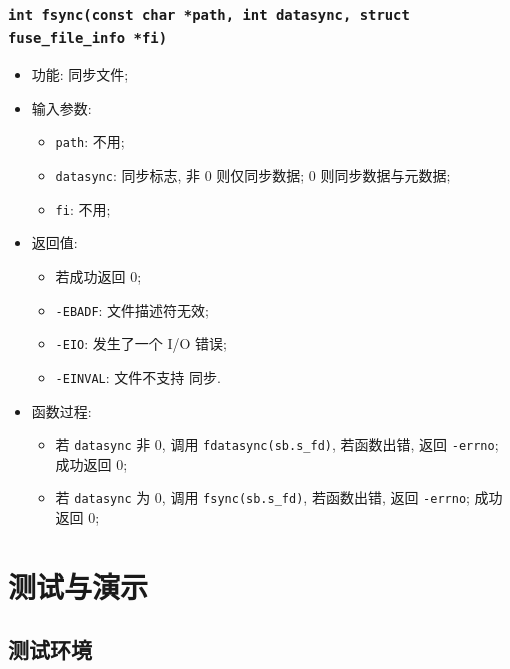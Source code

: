 \documentclass[nofonts]{ctexart}
\begin{document}
  \subsubsection{\texttt{int fsync(const char *path, int datasync, struct fuse\_file\_info *fi)}}

  \begin{itemize}
\item
  功能: 同步文件;
\item
  输入参数:

  \begin{itemize}
  \item
    \texttt{path}: 不用;
  \item
    \texttt{datasync}: 同步标志, 非 0 则仅同步数据; 0
    则同步数据与元数据;
  \item
    \texttt{fi}: 不用;
  \end{itemize}
\item
  返回值:

  \begin{itemize}
  \item
    若成功返回 0;
  \item
    \texttt{-EBADF}: 文件描述符无效;
  \item
    \texttt{-EIO}: 发生了一个 I/O 错误;
  \item
    \texttt{-EINVAL}: 文件不支持 同步.
  \end{itemize}
\item
  函数过程:

  \begin{itemize}
  \item
    若 \texttt{datasync} 非 0, 调用 \texttt{fdatasync(sb.s\_fd)},
    若函数出错, 返回 \texttt{-errno}; 成功返回 0;
  \item
    若 \texttt{datasync} 为 0, 调用 \texttt{fsync(sb.s\_fd)},
    若函数出错, 返回 \texttt{-errno}; 成功返回 0;
  \end{itemize}
\end{itemize}

\section{测试与演示}\label{ux6d4bux8bd5ux4e0eux6f14ux793a}

\subsection{测试环境}\label{ux6d4bux8bd5ux73afux5883}
\end{document}
